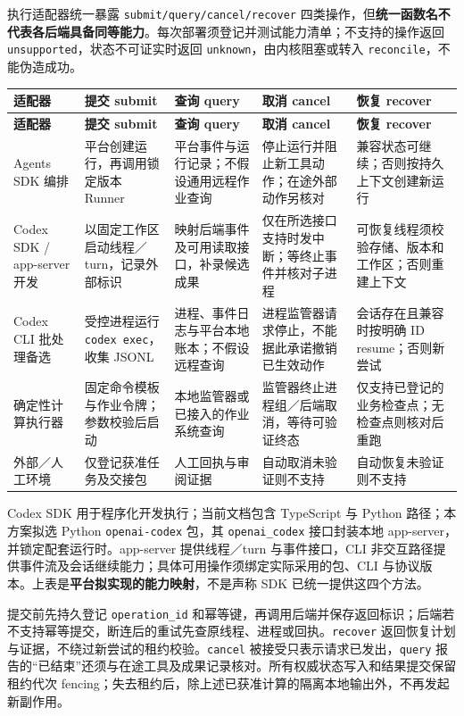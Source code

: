 \documentclass[11pt,a4paper]{article}
\begin{document}
执行适配器统一暴露 \texttt{submit/query/cancel/recover} 四类操作，但\textbf{统一函数名不代表各后端具备同等能力}。每次部署须登记并测试能力清单；不支持的操作返回 \texttt{unsupported}，状态不可证实时返回 \texttt{unknown}，由内核阻塞或转入 \texttt{reconcile}，不能伪造成功。

\begingroup\small
\begin{longtable}{P{2.65cm}P{2.9cm}P{2.9cm}P{2.9cm}P{2.85cm}}
\toprule\textbf{适配器} & \textbf{提交 submit} & \textbf{查询 query} & \textbf{取消 cancel} & \textbf{恢复 recover}\\\midrule\endfirsthead
\toprule\textbf{适配器} & \textbf{提交 submit} & \textbf{查询 query} & \textbf{取消 cancel} & \textbf{恢复 recover}\\\midrule\endhead
Agents SDK 编排 & 平台创建运行，再调用锁定版本 Runner & 平台事件与运行记录；不假设通用远程作业查询 & 停止运行并阻止新工具动作；在途外部动作另核对 & 兼容状态可继续；否则按持久上下文创建新运行\\
Codex SDK / app-server 开发 & 以固定工作区启动线程／turn，记录外部标识 & 映射后端事件及可用读取接口，补录候选成果 & 仅在所选接口支持时发中断；等终止事件并核对子进程 & 可恢复线程须校验存储、版本和工作区；否则重建上下文\\
Codex CLI 批处理备选 & 受控进程运行 \texttt{codex exec}，收集 JSONL & 进程、事件日志与平台本地账本；不假设远程查询 & 进程监管器请求停止，不能据此承诺撤销已生效动作 & 会话存在且兼容时按明确 ID resume；否则新尝试\\
确定性计算执行器 & 固定命令模板与作业令牌；参数校验后启动 & 本地监管器或已接入的作业系统查询 & 监管器终止进程组／后端取消，等待可验证终态 & 仅支持已登记的业务检查点；无检查点则核对后重跑\\
外部／人工环境 & 仅登记获准任务及交接包 & 人工回执与审阅证据 & 自动取消未验证则不支持 & 自动恢复未验证则不支持\\
\bottomrule
\end{longtable}
\endgroup

Codex SDK 用于程序化开发执行；当前文档包含 TypeScript 与 Python 路径；本方案拟选 Python \texttt{openai-codex} 包，其 \texttt{openai\_codex} 接口封装本地 app-server，并锁定配套运行时。app-server 提供线程／turn 与事件接口，CLI 非交互路径提供事件流及会话继续能力；具体可用操作须绑定实际采用的包、CLI 与协议版本。上表是\textbf{平台拟实现的能力映射}，不是声称 SDK 已统一提供这四个方法。\cite{codex-sdk,codex-app,v121-codex-exec}

提交前先持久登记 \texttt{operation\_id} 和幂等键，再调用后端并保存返回标识；后端若不支持幂等提交，断连后的重试先查原线程、进程或回执。\texttt{recover} 返回恢复计划与证据，不绕过新尝试的租约校验。\texttt{cancel} 被接受只表示请求已发出，\texttt{query} 报告的“已结束”还须与在途工具及成果记录核对。所有权威状态写入和结果提交保留租约代次 fencing；失去租约后，除上述已获准计算的隔离本地输出外，不再发起新副作用。
\end{document}
